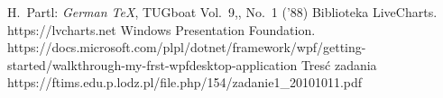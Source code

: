 \documentclass[12pt]{article}
\begin{document}

\begin{thebibliography}{99}
 H.~Partl:
\emph{German \TeX},
TUGboat Vol.~9,, No.~1 ('88)
 Biblioteka LiveCharts. https://lvcharts.net
 Windows Presentation Foundation. https://docs.microsoft.com/plpl/dotnet/framework/wpf/getting-started/walkthrough-my-frst-wpfdesktop-application
 Tresć zadania https://ftims.edu.p.lodz.pl/file.php/154/zadanie1\_20101011.pdf
\end{thebibliography}
\end{document}
